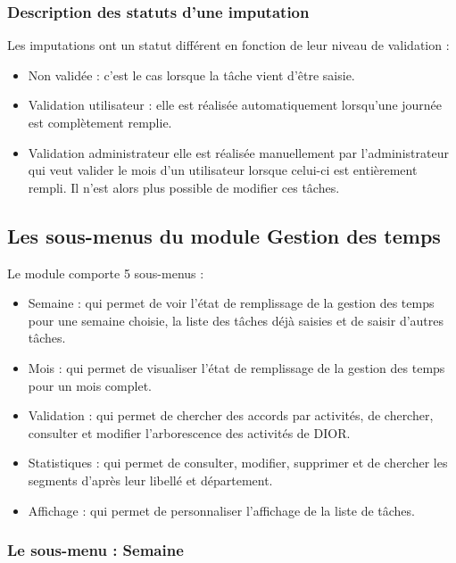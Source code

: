 \subsubsection{Description des statuts d'une imputation}

Les imputations ont un statut différent en fonction de leur niveau de validation :\\

\begin{itemize}
\item Non validée : c'est le cas lorsque la tâche vient d'être saisie.
\item Validation utilisateur : elle est réalisée automatiquement lorsqu'une journée est complètement remplie.
\item Validation administrateur elle est réalisée manuellement par l'administrateur qui veut valider le mois d'un utilisateur lorsque celui-ci est entièrement rempli. Il n'est alors plus possible de modifier ces tâches.
\end{itemize}


\subsection{Les sous-menus du module Gestion des temps}

Le module \timemanager comporte 5 sous-menus :

\begin{itemize}
\item Semaine : qui permet de voir l'état de remplissage de la gestion des temps pour une semaine choisie, la liste des tâches déjà saisies et de saisir d'autres tâches.
\item Mois : qui permet de visualiser l'état de remplissage de la gestion des temps pour un mois complet.
\item Validation : qui permet de chercher des accords par activités,
de chercher, consulter et modifier l'arborescence des activités de DIOR. 
\item Statistiques : qui permet de consulter, modifier, supprimer et de chercher
les segments d'après leur libellé et département.
\item Affichage : qui permet de personnaliser l'affichage de la liste de tâches.
\end{itemize}

\subsubsection{Le sous-menu : Semaine}

